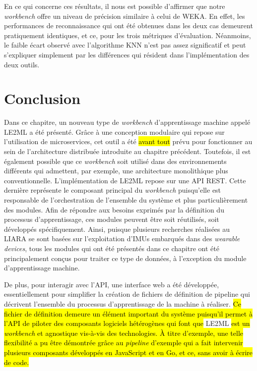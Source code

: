 En ce qui concerne ces résultats, il nous est possible d'affirmer que notre \textit{workbench} offre un niveau de précision similaire à celui de \acs{WEKA}. En effet, les performances de reconnaissance qui ont été obtenues dans les deux cas demeurent pratiquement identiques, et ce, pour les trois métriques d'évaluation. Néanmoins, le faible écart observé avec l'algorithme \acs{KNN} n'est pas assez significatif et peut s'expliquer simplement par les différences qui résident dans l'implémentation des deux outils.

\section{Conclusion}

Dans ce chapitre, un nouveau type de \textit{workbench} d'apprentissage machine appelé \ac{LE2ML} a été présenté. Grâce à une conception modulaire qui repose sur l'utilisation de microservices, cet outil a été \hl{avant tout} prévu pour fonctionner au sein de l'architecture distribuée introduite au chapitre précédent. Toutefois, il est également possible que ce \textit{workbench} soit utilisé dans des environnements différents qui admettent, par exemple, une architecture monolithique plus conventionnelle. L'implémentation de \acs{LE2ML} repose sur une \acs{API} \acs{REST}. Cette dernière représente le composant principal du \textit{workbench} puisqu'elle est responsable de l'orchestration de l'ensemble du système et plus particulièrement des modules. Afin de répondre aux besoins exprimés par la définition du processus d'apprentissage, ces modules peuvent être soit réutilisés, soit développés spécifiquement. Ainsi, puisque plusieurs recherches réalisées au \acs{LIARA} se sont basées sur l'exploitation d'\acsp{IMU} embarqués dans des \textit{wearable devices}, tous les modules qui ont été présentés dans ce chapitre ont été principalement conçus pour traiter ce type de données, à l'exception du module d'apprentissage machine.

De plus, pour interagir avec l'\acs{API}, une interface web a été développée, essentiellement pour simplifier la création de fichiers de définition de pipeline qui décrivent l'ensemble du processus d'apprentissage de la machine à réaliser. \hl{Ce fichier de définition demeure un élément important du système puisqu'il permet à l'API de piloter des composants logiciels hétérogènes qui font que} \acs{LE2ML} \hl{est un \textit{workbench} et agnostique vis-à-vis des technologies. À titre d'exemple, une telle flexibilité a pu être démontrée grâce au \textit{pipeline} d'exemple qui a fait intervenir plusieurs composants développés en JavaScript et en Go, et ce, sans avoir à écrire de code.}


